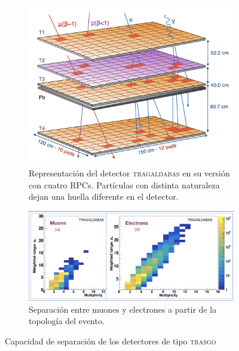 \documentclass[a4paper]{article}
\begin{document}


\begin{figure}[h] 
  \centering
  \begin{subfigure}[c]{0.45\linewidth}
    \centering
    \includegraphics[width=\linewidth]{tragas_3d.png} 
    \caption{Representación del detector \textsc{tragaldabas} en su versión con cuatro RPCs. Partículas con distinta naturaleza dejan una huella diferente en el detector.}
    \label{fg:intro1-a} 
  \end{subfigure} 
  \hspace{0.2cm}
  \begin{subfigure}[c]{0.45\linewidth}
    \centering
    \includegraphics[width=\linewidth]{b_midasp.jpeg} 
    \caption{Separación entre muones y electrones a partir de la topología del evento.} 
    \label{fg:intro1-b} 
  \end{subfigure}%
  \caption{Capacidad de separación de los detectores de tipo \textsc{trasgo}}
  \label{fg:intro1} 
\end{figure}
\end{document}
